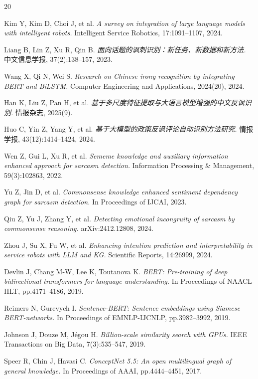 \documentclass[conference]{IEEEtran}
\begin{document}
\begin{thebibliography}{20}

Kim Y, Kim D, Choi J, et al.
\textit{A survey on integration of large language models with intelligent robots.}
Intelligent Service Robotics, 17:1091--1107, 2024.

Liang B, Lin Z, Xu R, Qin B.
\textit{面向话题的讽刺识别：新任务、新数据和新方法.}
中文信息学报, 37(2):138--157, 2023.

Wang X, Qi N, Wei S.
\textit{Research on Chinese irony recognition by integrating BERT and BiLSTM.}
Computer Engineering and Applications, 2024(20), 2024.

Han K, Liu Z, Pan H, et al.
\textit{基于多尺度特征提取与大语言模型增强的中文反讽识别.}
情报杂志, 2025(9).

Huo C, Yin Z, Yang Y, et al.
\textit{基于大模型的政策反讽评论自动识别方法研究.}
情报学报, 43(12):1414--1424, 2024.

Wen Z, Gui L, Xu R, et al.
\textit{Sememe knowledge and auxiliary information enhanced approach for sarcasm detection.}
Information Processing \& Management, 59(3):102863, 2022.

Yu Z, Jin D, et al.
\textit{Commonsense knowledge enhanced sentiment dependency graph for sarcasm detection.}
In Proceedings of IJCAI, 2023.

Qiu Z, Yu J, Zhang Y, et al.
\textit{Detecting emotional incongruity of sarcasm by commonsense reasoning.}
arXiv:2412.12808, 2024.

Zhou J, Su X, Fu W, et al.
\textit{Enhancing intention prediction and interpretability in service robots with LLM and KG.}
Scientific Reports, 14:26999, 2024.

Devlin J, Chang M-W, Lee K, Toutanova K.
\textit{BERT: Pre-training of deep bidirectional transformers for language understanding.}
In Proceedings of NAACL-HLT, pp.4171--4186, 2019.

Reimers N, Gurevych I.
\textit{Sentence-BERT: Sentence embeddings using Siamese BERT-networks.}
In Proceedings of EMNLP-IJCNLP, pp.3982--3992, 2019.

Johnson J, Douze M, J\'{e}gou H.
\textit{Billion-scale similarity search with GPUs.}
IEEE Transactions on Big Data, 7(3):535--547, 2019.

Speer R, Chin J, Havasi C.
\textit{ConceptNet 5.5: An open multilingual graph of general knowledge.}
In Proceedings of AAAI, pp.4444--4451, 2017.

\end{thebibliography}
\end{document}
